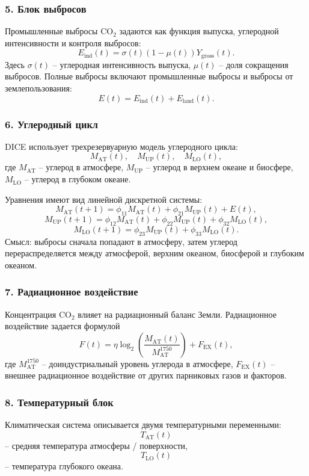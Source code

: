 \documentclass[12pt,a4paper]{article}
\begin{document}
\subsubsection*{5. Блок выбросов}
Промышленные выбросы CO$_2$ задаются как функция выпуска, углеродной интенсивности и контроля выбросов:
\[
E_{\mathrm{ind}}(t)=\sigma(t)(1-\mu(t))Y_{\mathrm{gross}}(t).
\]
Здесь $\sigma(t)$ -- углеродная интенсивность выпуска, $\mu(t)$ -- доля сокращения выбросов. Полные выбросы включают промышленные выбросы и выбросы от землепользования:
\[
E(t)=E_{\mathrm{ind}}(t)+E_{\mathrm{land}}(t).
\]

\subsubsection*{6. Углеродный цикл}
DICE использует трехрезервуарную модель углеродного цикла:
\[
M_{\mathrm{AT}}(t),\quad M_{\mathrm{UP}}(t),\quad M_{\mathrm{LO}}(t),
\]
где $M_{\mathrm{AT}}$ -- углерод в атмосфере, $M_{\mathrm{UP}}$ -- углерод в верхнем океане и биосфере, $M_{\mathrm{LO}}$ -- углерод в глубоком океане.

Уравнения имеют вид линейной дискретной системы:
\[
M_{\mathrm{AT}}(t+1)=\phi_{11}M_{\mathrm{AT}}(t)+\phi_{21}M_{\mathrm{UP}}(t)+E(t),
\]
\[
M_{\mathrm{UP}}(t+1)=\phi_{12}M_{\mathrm{AT}}(t)+\phi_{22}M_{\mathrm{UP}}(t)+\phi_{32}M_{\mathrm{LO}}(t),
\]
\[
M_{\mathrm{LO}}(t+1)=\phi_{23}M_{\mathrm{UP}}(t)+\phi_{33}M_{\mathrm{LO}}(t).
\]
Смысл: выбросы сначала попадают в атмосферу, затем углерод перераспределяется между атмосферой, верхним океаном, биосферой и глубоким океаном.

\subsubsection*{7. Радиационное воздействие}
Концентрация CO$_2$ влияет на радиационный баланс Земли. Радиационное воздействие задается формулой
\[
F(t)=\eta\log_2\left(\frac{M_{\mathrm{AT}}(t)}{M_{\mathrm{AT}}^{1750}}\right)+F_{\mathrm{EX}}(t),
\]
где $M_{\mathrm{AT}}^{1750}$ -- доиндустриальный уровень углерода в атмосфере, $F_{\mathrm{EX}}(t)$ -- внешнее радиационное воздействие от других парниковых газов и факторов.

\subsubsection*{8. Температурный блок}
Климатическая система описывается двумя температурными переменными:
\[
T_{\mathrm{AT}}(t)
\]
-- средняя температура атмосферы / поверхности,
\[
T_{\mathrm{LO}}(t)
\]
-- температура глубокого океана.
\end{document}
